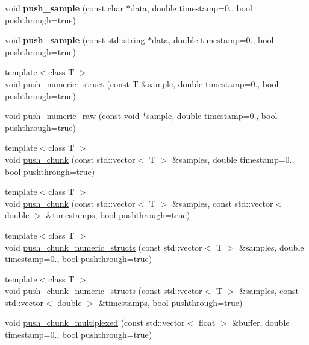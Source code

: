\begin{DoxyCompactItemize}
void {\bfseries push\+\_\+sample} (const char $\ast$data, double timestamp=0., bool pushthrough=true)
\item 
\mbox{\label{classlsl_1_1stream__outlet_a93e571140b73b4324051b8ef4b5606a4}} 
void {\bfseries push\+\_\+sample} (const std\+::string $\ast$data, double timestamp=0., bool pushthrough=true)
\item 
{\footnotesize template$<$class T $>$ }\\void \hyperlink{classlsl_1_1stream__outlet_a18b2da34bdd1306ef926d97532c43f28}{push\+\_\+numeric\+\_\+struct} (const T \&sample, double timestamp=0., bool pushthrough=true)
\item 
void \hyperlink{classlsl_1_1stream__outlet_a5c394e995a86d03cb71c3d180f855681}{push\+\_\+numeric\+\_\+raw} (const void $\ast$sample, double timestamp=0., bool pushthrough=true)
\item 
{\footnotesize template$<$class T $>$ }\\void \hyperlink{classlsl_1_1stream__outlet_a58427b98e8a60e7d160534078f3e04f8}{push\+\_\+chunk} (const std\+::vector$<$ T $>$ \&samples, double timestamp=0., bool pushthrough=true)
\item 
{\footnotesize template$<$class T $>$ }\\void \hyperlink{classlsl_1_1stream__outlet_a05ff22ae7b36a9e64dc08f71b45913e6}{push\+\_\+chunk} (const std\+::vector$<$ T $>$ \&samples, const std\+::vector$<$ double $>$ \&timestamps, bool pushthrough=true)
\item 
{\footnotesize template$<$class T $>$ }\\void \hyperlink{classlsl_1_1stream__outlet_ad7e1405b50bc546c4f742f508aa734cc}{push\+\_\+chunk\+\_\+numeric\+\_\+structs} (const std\+::vector$<$ T $>$ \&samples, double timestamp=0., bool pushthrough=true)
\item 
{\footnotesize template$<$class T $>$ }\\void \hyperlink{classlsl_1_1stream__outlet_a226b11eae43287c7b72e4d0ca1e812e7}{push\+\_\+chunk\+\_\+numeric\+\_\+structs} (const std\+::vector$<$ T $>$ \&samples, const std\+::vector$<$ double $>$ \&timestamps, bool pushthrough=true)
\item 
void \hyperlink{classlsl_1_1stream__outlet_adafb6b76614ea386917f696bdb272209}{push\+\_\+chunk\+\_\+multiplexed} (const std\+::vector$<$ float $>$ \&buffer, double timestamp=0., bool pushthrough=true)
\item 
\mbox{\label{classlsl_1_1stream__outlet_aa42becb37b937c5d6319dac67a0da4a4}} 

\end{DoxyCompactItemize}
